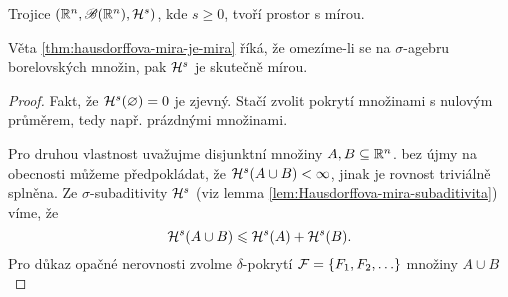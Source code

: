 \begin{lemma}
\end{lemma}
\begin{theorem}\label{thm:hausdorffova-mira-je-mira}
    Trojice $(\mathbb{R}^n,\mathscr{B}(\mathbb{R}^n),\mathcal{H}^s)$, kde $s\geqslant 0$, tvoří prostor s mírou.
\end{theorem}
Věta \ref{thm:hausdorffova-mira-je-mira} říká, že omezíme-li se na $\sigma$-agebru borelovských množin, pak $\mathcal{H}^s$ je skutečně mírou.
\begin{proof}
    Fakt, že $\mathcal{H}^s(\varnothing)=0$ je zjevný. Stačí zvolit pokrytí množinami s nulovým průměrem, tedy např. prázdnými množinami.

    Pro druhou vlastnost uvažujme disjunktní množiny $A,B\subseteq\mathbb{R}^n$. bez újmy na obecnosti můžeme předpokládat, že $\mathcal{H}^s(A\cup B)<\infty$, jinak je rovnost triviálně splněna. Ze $\sigma$-subaditivity $\mathcal{H}^s$ (viz lemma \ref{lem:Hausdorffova-mira-subaditivita}) víme, že
    \[\mathcal{H}^s(A\cup B)\leqslant\mathcal{H}^s(A)+\mathcal{H}^s(B).\]
    Pro důkaz opačné nerovnosti zvolme $\delta$-pokrytí $\mathcal{F}=\left\{F_1,F_2,\ldots\right\}$ množiny $A\cup B$
\end{proof}
